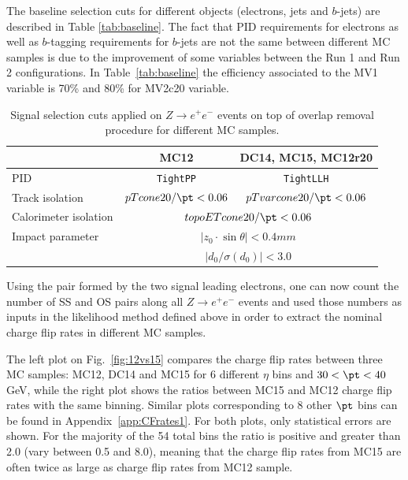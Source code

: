 The baseline selection cuts for different objects (electrons, jets and $b$-jets) are described in Table \ref{tab:baseline}. The fact that PID requirements for electrons as well as $b$-tagging requirements for $b$-jets are not the same between different MC samples is due to the improvement of some variables between the Run 1 and Run 2 configurations. In Table~\ref{tab:baseline} the efficiency associated to the MV1 variable is 70\% and 80\% for MV2c20 variable. 

\begin{table}[!htb]
\centering
\begin{tabular}{|l|c|c|}
\hline
 & MC12 & DC14, MC15, MC12r20 \\
\hline \hline
PID  & \texttt{TightPP}  & \texttt{TightLLH} \\
\hline
Track isolation & $pTcone20/\pt<0.06$ & $pTvarcone20/\pt<0.06$ \\
\hline
Calorimeter isolation & \multicolumn{2}{|c|}{$topoETcone20/\pt<0.06$} \\
\hline
Impact parameter & \multicolumn{2}{|c|}{$\left | z_0 \cdot \sin{\theta} \right |<0.4 mm $} \\
 &  \multicolumn{2}{|c|}{$\left | d_0 / \sigma(d_0) \right |<3.0$} \\
\hline
\end{tabular}
\caption{\label{tab:signal} Signal selection cuts applied on $Z\to e^+e^-$ events on top of overlap removal procedure for different MC samples.}
\end{table}

Using the pair formed by the two signal leading electrons, one can now count the number of SS and OS pairs along all $Z\to e^+e^-$ events and used those numbers as inputs in the likelihood method defined above in order to extract the nominal charge flip rates in different MC samples.

The left plot on Fig.~\ref{fig:12vs15} compares the charge flip rates between three MC samples: MC12, DC14 and MC15 for 6 different $\eta$ bins and $30<\pt<40$ GeV, while the right plot shows the ratios between MC15 and MC12 charge flip rates with the same binning. Similar plots corresponding to 8 other $\pt$ bins can be found in Appendix~\ref{app:CFrates1}. For both plots, only statistical errors are shown. For the majority of the 54 total bins the ratio is positive and greater than 2.0 (vary between 0.5 and 8.0), meaning that the charge flip rates from MC15 are often twice as large as charge flip rates from MC12 sample.

